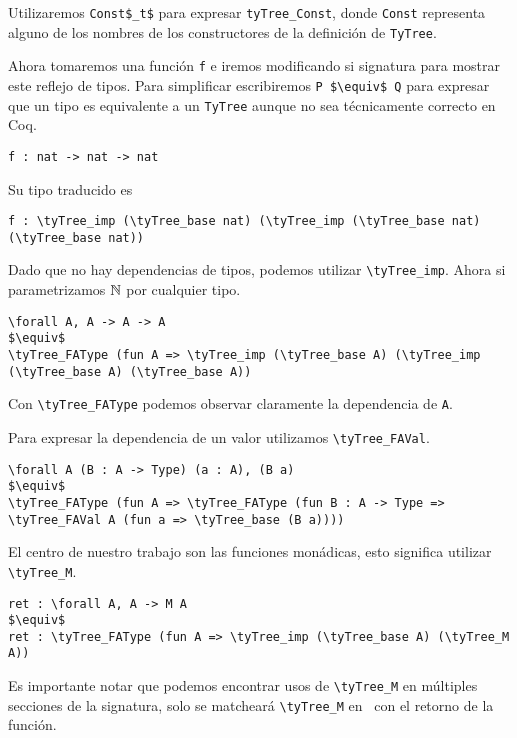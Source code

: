 Utilizaremos \lstinline{Const$_t$} para expresar \lstinline{tyTree_Const}, donde \lstinline{Const} representa alguno de los nombres de los constructores de la definición de \lstinline{TyTree}. 

Ahora tomaremos una función \lstinline{f} e iremos modificando si signatura para mostrar este reflejo de tipos.
Para simplificar escribiremos \lstinline{P $\equiv$ Q} para expresar que un tipo es equivalente a un \lstinline{TyTree} aunque no sea técnicamente correcto en Coq.

\begin{lstlisting}
f : nat -> nat -> nat
\end{lstlisting}

Su tipo traducido es

\begin{lstlisting}
f : \tyTree_imp (\tyTree_base nat) (\tyTree_imp (\tyTree_base nat) (\tyTree_base nat))
\end{lstlisting}

Dado que no hay dependencias de tipos, podemos utilizar \lstinline{\tyTree_imp}. Ahora si parametrizamos
$\mathbb{N}$ por cualquier tipo.

\begin{lstlisting}
\forall A, A -> A -> A
$\equiv$
\tyTree_FAType (fun A => \tyTree_imp (\tyTree_base A) (\tyTree_imp (\tyTree_base A) (\tyTree_base A))
\end{lstlisting}

Con \lstinline{\tyTree_FAType} podemos observar claramente la dependencia de \lstinline{A}.

Para expresar la dependencia de un valor utilizamos \lstinline{\tyTree_FAVal}.

\begin{lstlisting}
\forall A (B : A -> Type) (a : A), (B a)
$\equiv$
\tyTree_FAType (fun A => \tyTree_FAType (fun B : A -> Type => \tyTree_FAVal A (fun a => \tyTree_base (B a))))
\end{lstlisting}

El centro de nuestro trabajo son las funciones monádicas, esto significa utilizar \lstinline{\tyTree_M}.

\begin{lstlisting}
ret : \forall A, A -> M A
$\equiv$
ret : \tyTree_FAType (fun A => \tyTree_imp (\tyTree_base A) (\tyTree_M A))
\end{lstlisting}

Es importante notar que podemos encontrar usos de \lstinline{\tyTree_M} en múltiples secciones de la signatura, solo se matcheará \lstinline{\tyTree_M} en \lift\ con el retorno de la función. 

